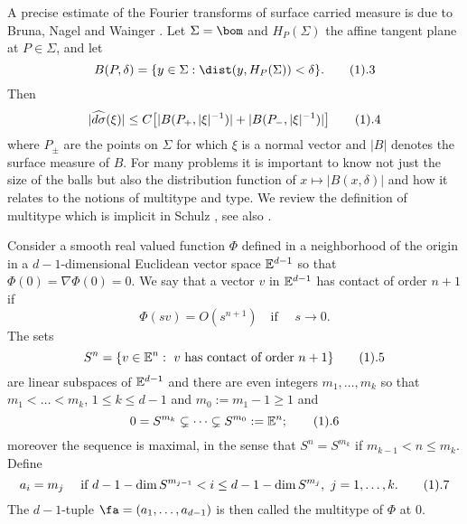 

A precise estimate  of the  Fourier transforms of surface carried measure is 
due to Bruna, Nagel and Wainger \cite{3}. Let $\Sigma=\bom$ and 
$H_P(\Sigma)$  the affine tangent plane at $P\in \Sigma$, and let
$$
B(P,\delta)=\{y\in \Sigma: \dist(y,H_P(\Sigma))<\delta\}.
\tag 1.3
$$
Then $$|\widehat {d\sigma}(\xi)|\le C \big[
|B(P_+,|\xi|^{-1})|+|B(P_-,|\xi|^{-1})| \big]
\tag 1.4
$$
where $P_\pm$ are the points on $\Sigma$ for which $\xi$ is a
normal vector and  $|B|$ denotes  the surface measure of $B$.
For many problems it is important to know not just the size of the 
balls but also  the distribution function  of $x\mapsto |B(x,\delta)|$
and how it relates to the notions of multitype and type.
We review the definition of multitype which is implicit in 
Schulz \cite{26}, see also \cite{17}.

Consider a smooth real valued
 function $\Phi$ defined in a neighborhood of the origin in
a  $d-1$-dimensional Euclidean  vector space
$\Bbb E^{d-1}$  so that $\Phi(0)=\nabla \Phi(0)=0$.
We say that a vector
 $v$ in $\Bbb E^{d-1}$  has contact of order $n+1$ if
$$
\Phi(sv)=O(s^{n+1})\quad \text {if }\quad  s\to 0.
$$
The sets  $$S^n=\{v\in \Bbb E^n: \text{ $v$ has contact of order $n+1$}\}
\tag 1.5 $$
are  linear subspaces of 
$\Bbb E^{d-1}$ and   there are   even integers $m_1,\dots, m_k$ so that
$m_1<\dots<m_k$, $1\le k\le d-1$ and $m_0:= m_1-1\ge 1$ and
$$
0=S^{m_k}\subsetneq\dots \subsetneq S^{m_0}:=\Bbb E^{n};
\tag 1.6
$$
moreover the sequence is maximal, in the sense that
$S^n=S^{m_{k}}$  if $ m_{k-1}< n\le  m_k.$
Define
$$
a_i=m_j \quad\text{  if } d-1-\dim S^{m_{j-1}}<i\le d-1-\dim S^{m_j},\,\,j=1,\dots,k.
\tag 1.7
$$
 The  $d-1$-tuple 
$\fa=(a_1,\dots, a_{d-1})$ is then called the  multitype
of $\Phi$ at $0$. 


